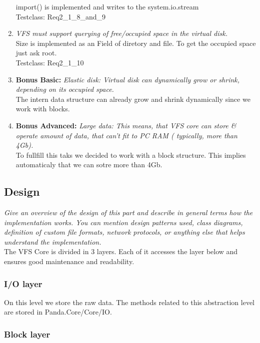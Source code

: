 \documentclass[a4paper,12pt]{article}
\begin{document}
\begin{enumerate}
		import() is implemented and writes to the system.io.stream\\
		Testclass: Req2\_1\_8\_and\_9
	\item \emph{VFS must support querying of free/occupied space in the virtual disk.}\\
		Size is implemented as an Field of diretory and file. To get the occupied space just ask root.\\
		Testclass: Req2\_1\_10
	\item \textbf{Bonus Basic:} \emph{Elastic disk: Virtual disk can dynamically grow or shrink, depending on its occupied space.}\\
		The intern data structure can already grow and shrink dynamically since we work with blocks.
	\item \textbf{Bonus Advanced:} \emph{Large data: This means, that VFS core can store \& operate amount of data, that can't fit to PC RAM ( typically, more than 4Gb).}\\
		To fullfill this taks we decided to work with a block structure. This implies automaticaly that we can sotre more than 4Gb.\\
\end{enumerate}

\subsection{Design}

\emph{Give an overview of the design of this part and describe in general terms how the implementation works. You can mention design patterns used, class diagrams, definition of custom file formats, network protocols, or anything else that helps understand the implementation.}\\

The VFS Core is divided in 3 layers. Each of it accesses the layer below and ensures good maintenance and readability.

\subsubsection{I/O layer}

On this level we store the raw data. The methods related to this abstraction level are stored in Panda.Core/Core/IO.

\subsubsection{Block layer}
\end{document}
